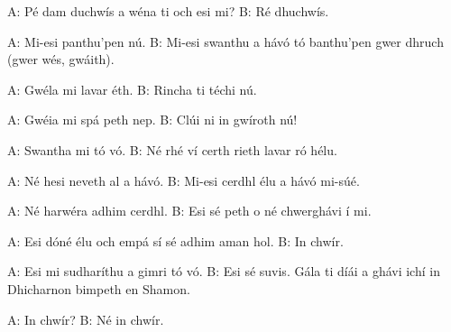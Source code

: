 A: P\'{e} dam duchw\'{i}s a w\'{e}na ti och esi mi?
B: R\'{e} dhuchw\'{i}s.

A: Mi-esi panthu'pen n\'{u}.
B: Mi-esi swanthu a h\'{a}v\'{o} t\'{o} banthu'pen gwer dhruch (gwer w\'{e}s, gw\'{a}ith).

A: Gw\'{e}la mi lavar \'{e}th.
B: Rincha ti t\'{e}chi n\'{u}.

A: Gw\'{e}ia mi sp\'{a} peth nep.
B: Cl\'{u}i ni in gw\'{i}roth n\'{u}!

A: Swantha mi t\'{o} v\'{o}.
B: N\'{e} rh\'{e} v\'{i} certh rieth lavar r\'{o} h\'{e}lu.

A: N\'{e} hesi neveth al a h\'{a}v\'{o}.
B: Mi-esi cerdhl \'{e}lu a h\'{a}v\'{o} mi-s\'{u}\'{e}.

A: N\'{e} harw\'{e}ra adhim cerdhl.
B: Esi s\'{e} peth o n\'{e} chwergh\'{a}vi \'{i} mi.

A: Esi d\'{o}n\'{e} \'{e}lu och emp\'{a} s\'{i} s\'{e} adhim aman hol.
B: In chw\'{i}r.

A: Esi mi sudhar\'{i}thu a gimri t\'{o} v\'{o}.
B: Esi s\'{e} suvis. G\'{a}la ti d\'{i}\'{a}i a gh\'{a}vi ich\'{i} in Dhicharnon bimpeth en Shamon.

A: In chw\'{i}r?
B: N\'{e} in chw\'{i}r.
